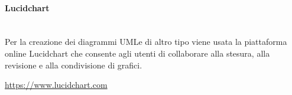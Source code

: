 		\paragraph{Lucidchart}\mbox{}\\ [1mm]
		Per la creazione dei diagrammi UML\glosp e di altro tipo viene usata la piattaforma online Lucidchart che consente agli utenti di collaborare alla stesura, alla revisione e alla condivisione di grafici. \newline \newline
		\centerline{\url{https://www.lucidchart.com}}

